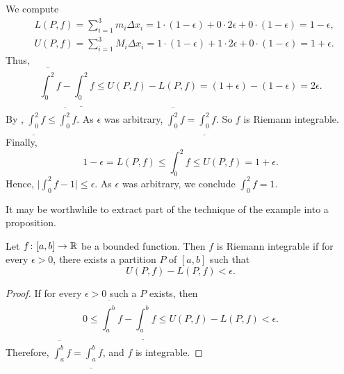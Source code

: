 \begin{example}
We compute
\begin{align*}
& L(P,f) = \sum_{i=1}^3 m_i \Delta x_i =
1 \cdot (1-\epsilon) + 0 \cdot 2\epsilon + 0 \cdot (1-\epsilon)
= 1-\epsilon , \\
& U(P,f) = \sum_{i=1}^3 M_i \Delta x_i =
1 \cdot (1-\epsilon) + 1 \cdot 2\epsilon + 0 \cdot (1-\epsilon)
= 1+\epsilon .
\end{align*}
Thus,
\begin{equation*}
\overline{\int_0^2} f - 
\underline{\int_0^2} f
\leq
U(P,f) - L(P,f)
=
(1+\epsilon)
- (1-\epsilon) = 2 \epsilon .
\end{equation*}
By , $\underline{\int_0^2} f \leq \overline{\int_0^2} f$.
As $\epsilon$ was arbitrary,
$\overline{\int_0^2} f = \underline{\int_0^2} f$.  So $f$ is Riemann
integrable.  Finally,
\begin{equation*}
1-\epsilon = L(P,f) \leq \int_0^2 f \leq U(P,f) =
1+\epsilon.
\end{equation*}
Hence, $\bigl\lvert \int_0^2 f - 1 \bigr\rvert \leq \epsilon$.  As $\epsilon$ was arbitrary,
we conclude $\int_0^2 f = 1$.
\end{example}

It may be worthwhile to extract part of the technique of the example into a
proposition.

\begin{prop}
Let $f \colon [a,b] \to {\mathbb{R}}$ be a bounded function.  Then $f$ is Riemann
integrable if for every $\epsilon > 0$, there exists a partition $P$ of
$[a,b]$ such that
\begin{equation*}
U(P,f) - L(P,f) < \epsilon .
\end{equation*}
\end{prop}

\begin{proof}
If for every $\epsilon > 0$ such a $P$ exists, then
\begin{equation*}
0 \leq
\overline{\int_a^b} f - 
\underline{\int_a^b} f
\leq
U(P,f) - L(P,f) < \epsilon .
\end{equation*}
Therefore, 
$\overline{\int_a^b} f = \underline{\int_a^b} f$, and $f$ is integrable.
\end{proof}

